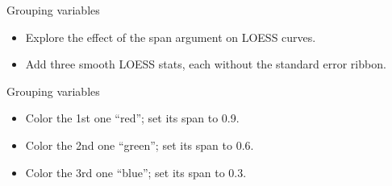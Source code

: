 \documentclass[
  ignorenonframetext,
]{beamer}
\begin{document}
\begin{frame}{Grouping variables}
\label{grouping-variables-6}
\begin{itemize}
\item
  Explore the effect of the span argument on LOESS curves.
\item
  Add three smooth LOESS stats, each without the standard error ribbon.
\end{itemize}
\end{frame}

\begin{frame}{Grouping variables}
\label{grouping-variables-7}
\begin{itemize}
\item
  Color the 1st one ``red''; set its span to 0.9.
\item
  Color the 2nd one ``green''; set its span to 0.6.
\item
  Color the 3rd one ``blue''; set its span to 0.3.
\end{itemize}
\end{frame}
\end{document}
